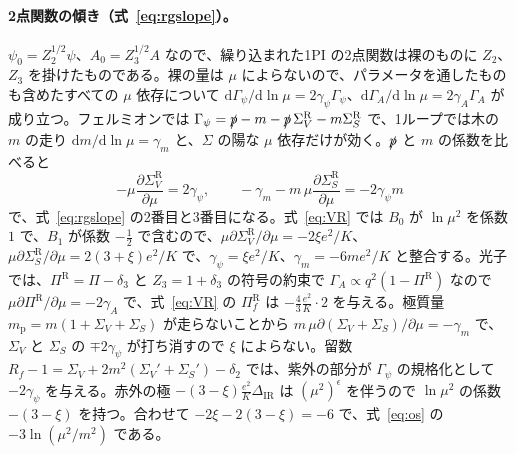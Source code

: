\documentclass[a4paper,10pt]{ltjsarticle}
\newcommand{\dd}{\mathrm{d}}
\newcommand{\DIR}{\Delta_{\mathrm{IR}}}
\begin{document}
\paragraph{2点関数の傾き（式~\eqref{eq:rgslope}）。}$\psi_0=Z_2^{1/2}\psi$、$A_0=Z_3^{1/2}A$ なので、繰り込まれた1PI の2点関数は裸のものに $Z_2$、$Z_3$ を掛けたものである。裸の量は $\mu$ によらないので、パラメータを通したものも含めたすべての $\mu$ 依存について $\dd\Gamma_\psi/\dd\ln\mu=2\gamma_\psi\Gamma_\psi$、$\dd\Gamma_A/\dd\ln\mu=2\gamma_A\Gamma_A$ が成り立つ。フェルミオンでは $\Gamma_\psi=\slashed p-m-\slashed p\,\Sigma_V^{\mathrm R}-m\Sigma_S^{\mathrm R}$ で、1ループでは木の $m$ の走り $\dd m/\dd\ln\mu=\gamma_m$ と、$\Sigma$ の陽な $\mu$ 依存だけが効く。$\slashed p$ と $m$ の係数を比べると
\begin{equation*}
-\mu\frac{\partial\Sigma_V^{\mathrm R}}{\partial\mu}=2\gamma_\psi,\qquad
-\gamma_m-m\,\mu\frac{\partial\Sigma_S^{\mathrm R}}{\partial\mu}=-2\gamma_\psi m
\end{equation*}
で、式~\eqref{eq:rgslope} の2番目と3番目になる。式~\eqref{eq:VR} では $B_0$ が $\ln\mu^2$ を係数 $1$ で、$B_1$ が係数 $-\frac12$ で含むので、$\mu\partial\Sigma_V^{\mathrm R}/\partial\mu=-2\xi e^2/K$、$\mu\partial\Sigma_S^{\mathrm R}/\partial\mu=2(3+\xi)e^2/K$ で、$\gamma_\psi=\xi e^2/K$、$\gamma_m=-6me^2/K$ と整合する。光子では、$\Pi^{\mathrm R}=\Pi-\delta_3$ と $Z_3=1+\delta_3$ の符号の約束で $\Gamma_A\propto q^2(1-\Pi^{\mathrm R})$ なので $\mu\partial\Pi^{\mathrm R}/\partial\mu=-2\gamma_A$ で、式~\eqref{eq:VR} の $\Pi_f^{\mathrm R}$ は $-\frac43\frac{e^2}{K}\cdot2$ を与える。極質量 $m_{\mathrm p}=m(1+\Sigma_V+\Sigma_S)$ が走らないことから $m\,\mu\partial(\Sigma_V+\Sigma_S)/\partial\mu=-\gamma_m$ で、$\Sigma_V$ と $\Sigma_S$ の $\mp2\gamma_\psi$ が打ち消すので $\xi$ によらない。留数 $R_f-1=\Sigma_V+2m^2(\Sigma_V'+\Sigma_S')-\delta_2$ では、紫外の部分が $\Gamma_\psi$ の規格化として $-2\gamma_\psi$ を与える。赤外の極 $-(3-\xi)\frac{e^2}{K}\DIR$ は $(\mu^2)^\epsilon$ を伴うので $\ln\mu^2$ の係数 $-(3-\xi)$ を持つ。合わせて $-2\xi-2(3-\xi)=-6$ で、式~\eqref{eq:os} の $-3\ln(\mu^2/m^2)$ である。
\end{document}
